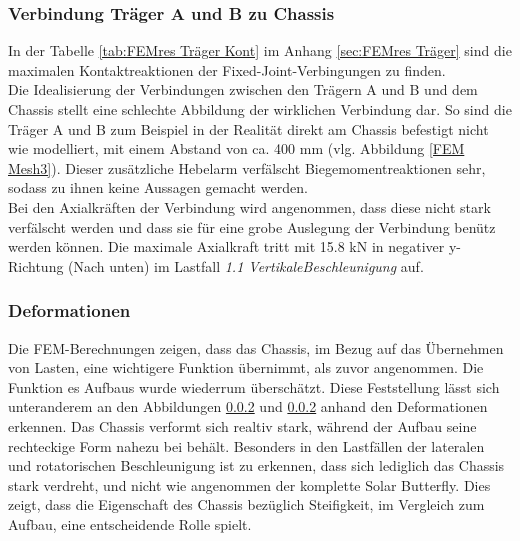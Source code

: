\subsubsection{Verbindung Träger A und B zu Chassis}
In der Tabelle \ref{tab:FEMres Träger Kont} im Anhang \ref{sec:FEMres Träger} sind die maximalen Kontaktreaktionen der Fixed-Joint-Verbingungen zu finden.\\
Die Idealisierung der Verbindungen zwischen den Trägern A und B und dem Chassis stellt eine schlechte Abbildung der wirklichen Verbindung dar. So sind die Träger A und B zum Beispiel in der Realität direkt am Chassis befestigt nicht wie modelliert, mit einem Abstand von ca. 400 mm (vlg. Abbildung \ref{FEM Mesh3}). Dieser zusätzliche Hebelarm verfälscht Biegemomentreaktionen sehr, sodass zu ihnen keine Aussagen gemacht werden.\\
Bei den Axialkräften der Verbindung wird angenommen, dass diese nicht stark verfälscht werden und dass sie für eine grobe Auslegung der Verbindung benütz werden können. Die maximale Axialkraft tritt mit 15.8 kN in negativer y-Richtung (Nach unten) im Lastfall \emph{1.1 VertikaleBeschleunigung} auf.


\subsubsection{Deformationen}
Die FEM-Berechnungen zeigen, dass das Chassis, im Bezug auf das Übernehmen von Lasten, eine wichtigere Funktion übernimmt, als zuvor angenommen. Die Funktion es Aufbaus wurde wiederrum überschätzt. Diese Feststellung lässt sich unteranderem an den Abbildungen \ref{} und \ref{} anhand den Deformationen erkennen. Das Chassis verformt sich realtiv stark, während der Aufbau seine rechteckige Form nahezu bei behält. Besonders in den Lastfällen der lateralen und rotatorischen Beschleunigung ist zu erkennen, dass sich lediglich das Chassis stark verdreht, und nicht wie angenommen der komplette Solar Butterfly. Dies zeigt, dass die Eigenschaft des Chassis bezüglich Steifigkeit, im Vergleich zum Aufbau, eine entscheidende Rolle spielt. \\

